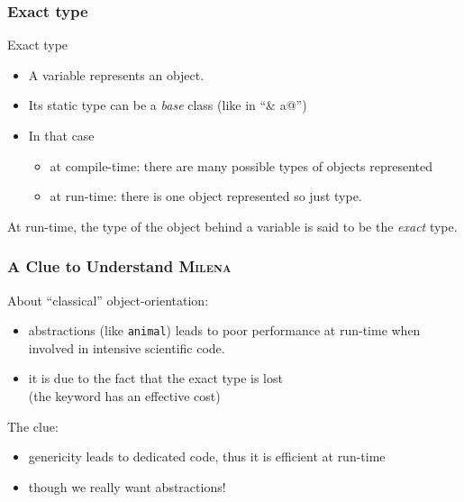 \documentclass{beamer}
\newcommand{\kw}[1]{{\color{blue}{\texttt{#1}}}\xspace}
\newcommand{\code}[1]{{\scriptsize{\texttt{#1}}}\xspace}
\newcommand{\mln}{\textsc{Milena}\xspace}
\begin{document}
\begin{frame}
  \frametitle{Exact type}
  
  \begin{block}{Exact type}
    \begin{itemize}
    \item A variable represents an object.
    \item Its static type can be a \textit{base} class (like in ``\lstinline@animal& a@'')
    \item In that case
      \begin{itemize}
      \item at compile-time: there are many possible types of objects represented
      \item at run-time: there is one object represented so just type.
      \end{itemize}
    \end{itemize}

    At run-time, the type of the object behind a variable is said to
    be the \emph{exact} type.
  \end{block}
  
\end{frame}



\begin{frame}
  \frametitle{A Clue to Understand \mln}

  About ``classical'' object-orientation:

  \begin{itemize}
  \item abstractions (like \code{animal}) leads to poor
    performance at run-time when involved in intensive scientific code.
  \item it is due to the fact that the exact type is lost\\
    (the \kw{virtual} keyword has an effective cost)
  \end{itemize}
  
  \smallskip

  The clue:

  \begin{itemize}
  \item genericity leads to dedicated code, thus it is efficient at run-time
  \item though we really want abstractions!
  \end{itemize}
  

\end{frame}
\end{document}
